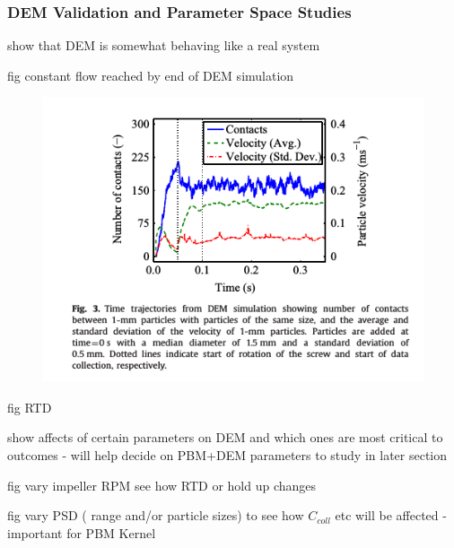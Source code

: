 \documentclass[preprint,11pt,authoryear]{elsarticle}
\begin{document}
	    \subsubsection{DEM Validation and Parameter Space Studies}
	    \par show that DEM is somewhat behaving like a real system
	    \par fig constant flow reached by end of DEM simulation
	      \begin{figure}[H]
	      \centering
	      \includegraphics[scale=0.8]{rslts_DEM_time_traj}
	      \caption{  }
	      \label{fig:rslts_DEM_time_traj}
	      \end{figure} 
	    \par fig RTD
	    \par show affects of certain parameters on DEM and which ones are most critical to outcomes - will help decide on PBM+DEM parameters to study in later section
	    \par fig vary impeller RPM see how RTD or hold up changes
	    \par fig vary PSD ( range and/or particle sizes) to see how $C_{coll}$ etc will be affected - important for PBM Kernel
\end{document}
